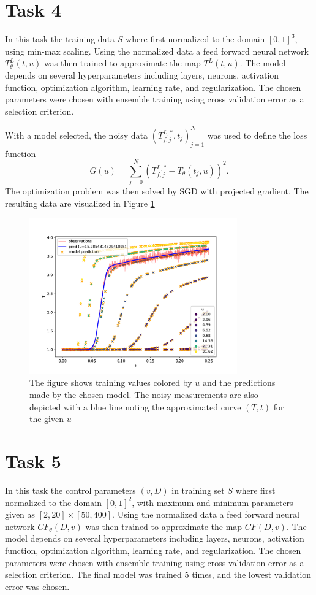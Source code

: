 \documentclass[a4paper]{article}
\begin{document}
\section*{Task 4}
In this task the training data $S$ where first normalized to the domain $[0,1]^3$, using min-max scaling. Using the normalized data a feed forward neural network $T^L_{\theta}(t, u)$ was then trained to approximate the map $T^L(t, u)$. The model depends on several hyperparameters including layers, neurons, activation function, optimization algorithm, learning rate, and regularization. The chosen parameters were chosen with ensemble training using cross validation error as a selection criterion.

With a model selected, the noisy data $(T_{f,j}^{L,*}, t_j)_{j=1}^{N}$ was used to define the loss function
\begin{equation}
	G(u) = \sum_{j=0}^{N}{(T_{f,j}^{L,*} - T_{\theta}(t_j,u))^2}.
\end{equation}
The optimization problem was then solved by SGD with projected gradient. The resulting data are visualized in Figure \ref{fig:task4}
\begin{figure}[t]
    \centering
    \includegraphics[width=0.8\textwidth]{figures/task4/final.pdf}
    \caption{The figure shows training values colored by $u$ and the predictions made by the chosen model. The noisy measurements are also depicted with a blue line noting the approximated curve $(T,t)$ for the given $u$}
    \label{fig:task4}
\end{figure}

\section*{Task 5}
In this task the control parameters $(v,D)$ in training set $S$ where first normalized to the domain $[0,1]^2$,  with maximum and minimum parameters given as $[2,20]\times[50,400]$. Using the normalized data a feed forward neural network $CF_{\theta}(D, v)$ was then trained to approximate the map $CF(D, v)$. The model depends on several hyperparameters including layers, neurons, activation function, optimization algorithm, learning rate, and regularization. The chosen parameters were chosen with ensemble training using cross validation error as a selection criterion.  The final model was trained 5 times, and the lowest validation error was chosen. 
\end{document}
